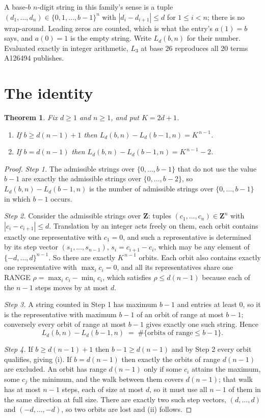 \documentclass[11pt,a4paper]{article}
\theoremstyle{plain}
\newtheorem{theorem}{Theorem}
\theoremstyle{definition}
\begin{document}
A base-$b$ $n$-digit string in this family's sense is a tuple
$(d_1,\dots,d_n)\in\{0,1,\dots,b-1\}^{n}$ with $|d_i-d_{i+1}|\le d$ for $1\le i<n$; there
is no wrap-around. Leading zeros are counted, which is what the entry's $a(1)=b$ says, and
$a(0)=1$ is the empty string. Write $L_d(b,n)$ for their number. Evaluated exactly in integer
arithmetic, $L_{3}$ at base $26$ reproduces all $20$ terms A126494 publishes.

\section{The identity}

\begin{theorem}
Fix $d\ge1$ and $n\ge1$, and put $K=2d+1$.
\begin{enumerate}
\item[(i)] If $b\ge d(n-1)+1$ then $L_d(b,n)-L_d(b-1,n)=K^{\,n-1}$.
\item[(ii)] If $b=d(n-1)$ then $L_d(b,n)-L_d(b-1,n)=K^{\,n-1}-2$.
\end{enumerate}
\end{theorem}

\begin{proof}
\emph{Step 1.} The admissible strings over $\{0,\dots,b-1\}$ that do not use the value $b-1$
are exactly the admissible strings over $\{0,\dots,b-2\}$, so $L_d(b,n)-L_d(b-1,n)$ is the
number of admissible strings over $\{0,\dots,b-1\}$ in which $b-1$ occurs.

\emph{Step 2.} Consider the admissible strings over $\mathbf{Z}$: tuples
$(c_1,\dots,c_n)\in\mathbf{Z}^{n}$ with $|c_i-c_{i+1}|\le d$. Translation by an integer acts
freely on them, each orbit contains exactly one representative with $c_1=0$, and such a
representative is determined by its step vector $(s_1,\dots,s_{n-1})$, $s_i=c_{i+1}-c_i$,
which may be any element of $\{-d,\dots,d\}^{n-1}$. So there are exactly $K^{\,n-1}$ orbits.
Each orbit also contains exactly one representative with $\max_i c_i=0$, and all its
representatives share one RANGE $\rho=\max_ic_i-\min_ic_i$, which satisfies
$\rho\le d(n-1)$ because each of the $n-1$ steps moves by at most $d$.

\emph{Step 3.} A string counted in Step 1 has maximum $b-1$ and entries at least $0$, so it is
the representative with maximum $b-1$ of an orbit of range at most $b-1$; conversely every orbit
of range at most $b-1$ gives exactly one such string. Hence
\[
L_d(b,n)-L_d(b-1,n)\;=\;\#\{\text{orbits of range}\le b-1\} .
\]

\emph{Step 4.} If $b\ge d(n-1)+1$ then $b-1\ge d(n-1)$ and by Step 2 every orbit qualifies,
giving (i). If $b=d(n-1)$ then exactly the orbits of range $d(n-1)$ are excluded. An orbit has
range $d(n-1)$ only if some $c_i$ attains the maximum, some $c_j$ the minimum, and the walk
between them covers $d(n-1)$; that walk has at most $n-1$ steps, each of size at most $d$, so it
must use all $n-1$ of them in the same direction at full size. There are exactly two such step
vectors, $(d,\dots,d)$ and $(-d,\dots,-d)$, so two orbits are lost and (ii) follows.
\end{proof}
\end{document}
